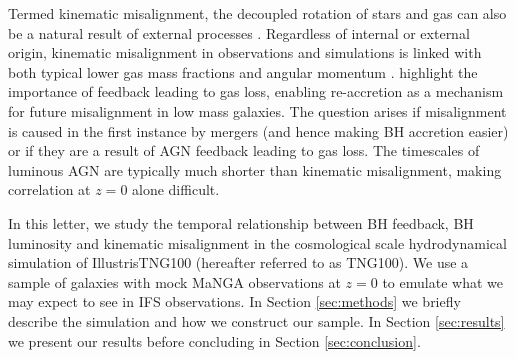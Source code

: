 \documentclass[fleqn,usenatbib]{mnras}
\newcommand{\red}[1]{{\textcolor{red}{#1}}}
\begin{document}
Termed kinematic misalignment, the decoupled rotation of stars and gas can also be a natural result of external processes \cite[e.g.][]{davis2011, barrera2015, vdvoort2015, jin2016, bryant2019, duckworth2019_halo}. Regardless of internal or external origin, kinematic misalignment in observations and simulations is linked with both typical lower gas mass fractions and angular momentum \citep[][]{duckworth2019}. \citet{starkenburg+19} highlight the importance of feedback leading to gas loss, enabling re-accretion as a mechanism for future misalignment in low mass galaxies. The question arises if misalignment is caused in the first instance by mergers (and hence making BH accretion easier) or if they are a result of AGN feedback leading to gas loss. 
The timescales of luminous AGN are typically much shorter than kinematic misalignment, making correlation at $z=0$ alone difficult. 

In this letter, we study the temporal relationship between BH feedback, BH luminosity and kinematic misalignment in the cosmological scale hydrodynamical simulation of IllustrisTNG100 (hereafter referred to as TNG100). We use a sample of galaxies with mock MaNGA \citep[Mapping Galaxies at Apache Point;][]{bundy2015, blanton2017} observations at $z=0$ to emulate what we may expect to see in IFS observations. In Section \ref{sec:methods} we briefly describe the simulation and how we construct our sample. In Section \ref{sec:results} we present our results before concluding in Section \ref{sec:conclusion}.
\end{document}
